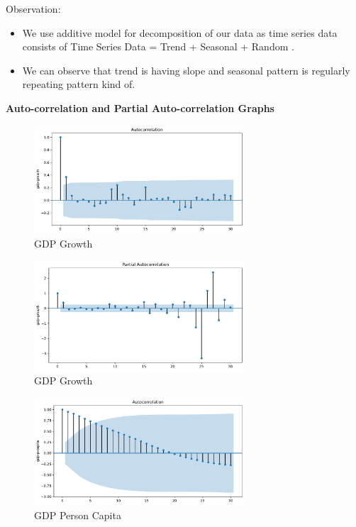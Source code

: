 Observation:
\begin{itemize}
    \item We use additive model for decomposition of our data as time series data consists of Time Series Data = Trend + Seasonal + Random .
\item We can observe that trend is having slope and seasonal pattern is regularly repeating pattern kind of.
\end{itemize}

\vspace{20mm}
\textbf{Auto-correlation and Partial Auto-correlation Graphs}\\
\begin{figure}[H]
    \centering
    \includegraphics[width=0.7\textwidth]{Images/gdp-growth_Acorr.pdf}
    \caption{GDP Growth}
    \label{fig1}
\end{figure}

\begin{figure}[H]
    \centering
    \includegraphics[width=0.7\textwidth]{Images/gdp-growth_PAcorr.pdf}
    \caption{GDP Growth}
    \label{fig1}
\end{figure}

\begin{figure}[H]
    \centering
    \includegraphics[width=0.7\textwidth]{Images/gdp-p-capita_Acorr.pdf}
    \caption{GDP Person Capita}
    \label{fig1}
\end{figure}

